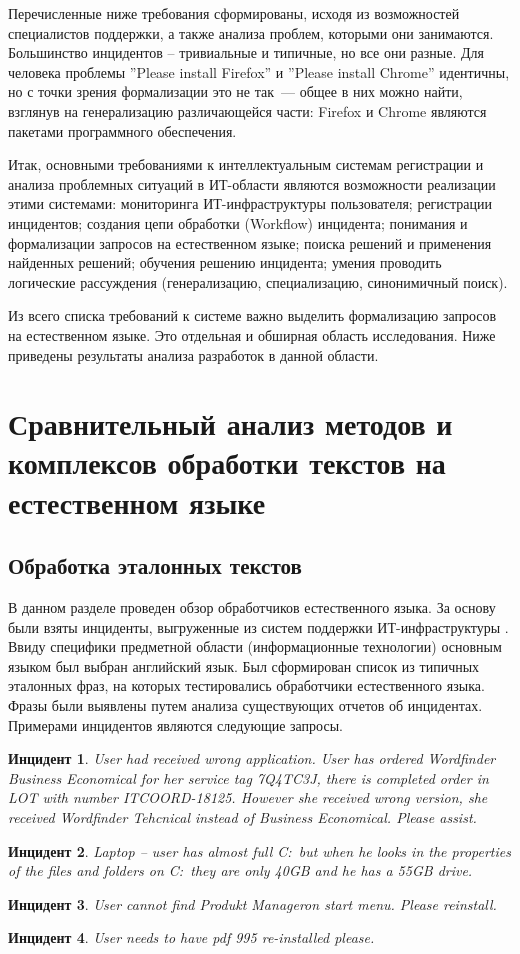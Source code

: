 Перечисленные ниже требования сформированы, исходя из возможностей специалистов поддержки, а также анализа проблем, которыми они занимаются. Большинство инцидентов – тривиальные и типичные, но все они разные. Для человека проблемы ”Please install Firefox” и ”Please install Chrome” идентичны, но с точки зрения формализации это не так~--- общее в них можно найти, взглянув на генерализацию различающейся части: Firefox и Chrome являются пакетами программного обеспечения. \par
Итак, основными требованиями к интеллектуальным системам регистрации и анализа проблемных ситуаций в ИТ-области являются возможности реализации этими системами: мониторинга ИТ-инфраструктуры пользователя; регистрации инцидентов; создания цепи обработки (Workflow) инцидента; понимания и формализации запросов на естественном языке; поиска решений и применения найденных решений; обучения решению инцидента; умения проводить логические рассуждения (генерализацию, специализацию, синонимичный поиск). \par
Из всего списка требований к системе важно выделить формализацию запросов на естественном языке. Это отдельная и обширная область исследования. Ниже приведены результаты анализа разработок в данной области. 

\clearpage

\section{Сравнительный анализ методов и комплексов обработки текстов на естественном языке}


\subsection{Обработка эталонных текстов} \label{sect2_1}
В данном разделе проведен обзор обработчиков естественного языка. За основу были взяты инциденты, выгруженные из систем поддержки ИТ-инфраструктуры \icl. Ввиду специфики предметной области (информационные технологии) основным языком был выбран английский язык. Был сформирован список из типичных эталонных фраз, на которых тестировались обработчики естественного языка. Фразы были выявлены путем анализа существующих отчетов об инцидентах. Примерами инцидентов являются следующие запросы.\par
\textbf{Инцидент 1}.
\textit{
User had received wrong application. User has ordered Wordfinder Business Economical for her service tag 7Q4TC3J, there is completed order in LOT with number ITCOORD-18125. However she received wrong version, she received Wordfinder Tehcnical instead of Business Economical. Please assist.
}\par
\textbf{Инцидент 2}.
\textit{
Laptop – user has almost full C:\ but when he looks in the properties of the files and folders on C:\ they are only 40GB and he has a 55GB drive.
}\par
\textbf{Инцидент 3}.
\textit{
User cannot find Produkt Manageron start menu. Please reinstall. 
}\par
\textbf{Инцидент 4}.
\textit{
User needs to have pdf 995 re-installed please.
}\par

